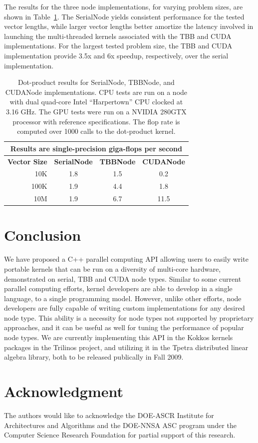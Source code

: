 \documentclass[10pt,conference,letterpaper]{IEEEtran}
\begin{document}
The results for the three node implementations, for varying problem sizes, are shown in Table~\ref{tbl:results}. The SerialNode yields consistent performance for the tested vector lengths, while larger vector lengths better amortize the latency involved in launching the multi-threaded kernels associated with the TBB and CUDA implementations. For the largest tested problem size, the TBB and CUDA implementation provide 3.5x and 6x speedup, respectively, over the serial implementation.

\begin{table}[!h]
\centering

\caption{Dot-product results for SerialNode, TBBNode, and CUDANode implementations. 
CPU tests are run on a node with dual quad-core Intel ``Harpertown'' CPU clocked at 3.16 GHz. The GPU tests were run on a NVIDIA 280GTX processor with reference specifications. The flop rate is computed over 1000 calls to the dot-product kernel.}
\label{tbl:results}

\begin{small}
\begin{tabular}{rccc}
\hline
\multicolumn{4}{c}{Results are single-precision giga-flops per second} \\\hline
{\bfseries Vector Size} & {\bfseries SerialNode} & {\bfseries TBBNode} & {\bfseries CUDANode} \\\hline
10K & 1.8 & 1.5 & 0.2 \\\hline
100K & 1.9 & 4.4 & 1.8  \\\hline
10M & 1.9 & 6.7 & 11.5 \\\hline
\end{tabular}
\end{small}

\end{table}

\section{Conclusion}

We have proposed a C++ parallel computing API allowing users to easily write portable kernels that can be run on a diversity of multi-core hardware, demonstrated on serial, TBB and CUDA node types. Similar to some current parallel computing efforts, kernel developers are able to develop in a single language, to a single programming model. However, unlike other efforts, node developers are fully capable of writing custom implementations for any desired node type. This ability is a necessity for node types not supported by proprietary approaches, and it can be useful as well for tuning the performance of popular node types. We are currently implementing this API in the Kokkos kernels packages in the Trilinos project, and utilizing it in the Tpetra distributed linear algebra library, both to be released publically in Fall 2009.

\section*{Acknowledgment}
The authors would like to acknowledge the DOE-ASCR Institute for Architectures and
Algorithms and the DOE-NNSA ASC program under the Computer Science Research Foundation for
partial support of this research.\\




\end{document}
